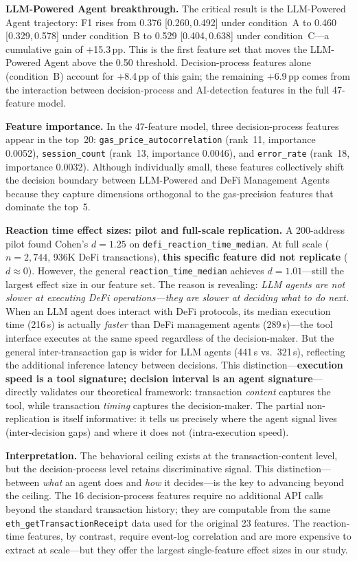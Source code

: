 \documentclass[sigconf,nonacm=false]{acmart}
\begin{document}
\textbf{LLM-Powered Agent breakthrough.} The critical result is the LLM-Powered Agent trajectory: F1 rises from 0.376 [0.260,\,0.492] under condition~A to 0.460 [0.329,\,0.578] under condition~B to 0.529 [0.404,\,0.638] under condition~C---a cumulative gain of $+$15.3\,pp. This is the first feature set that moves the LLM-Powered Agent above the 0.50 threshold. Decision-process features alone (condition~B) account for $+$8.4\,pp of this gain; the remaining $+$6.9\,pp comes from the interaction between decision-process and AI-detection features in the full 47-feature model.

\textbf{Feature importance.} In the 47-feature model, three decision-process features appear in the top~20: \texttt{gas\_price\_autocorrelation} (rank~11, importance 0.0052), \texttt{session\_count} (rank~13, importance 0.0046), and \texttt{error\_rate} (rank~18, importance 0.0032). Although individually small, these features collectively shift the decision boundary between LLM-Powered and DeFi Management Agents because they capture dimensions orthogonal to the gas-precision features that dominate the top~5.

\textbf{Reaction time effect sizes: pilot and full-scale replication.} A 200-address pilot found Cohen's $d{=}1.25$ on \texttt{defi\_reaction\_time\_median}. At full scale ($n{=}2{,}744$, 936K DeFi transactions), \textbf{this specific feature did not replicate} ($d{\approx}0$). However, the general \texttt{reaction\_time\_median} achieves $d{=}1.01$---still the largest effect size in our feature set. The reason is revealing: \emph{LLM agents are not slower at executing DeFi operations---they are slower at deciding what to do next.} When an LLM agent does interact with DeFi protocols, its median execution time (216\,s) is actually \emph{faster} than DeFi management agents (289\,s)---the tool interface executes at the same speed regardless of the decision-maker. But the general inter-transaction gap is wider for LLM agents (441\,s vs.\ 321\,s), reflecting the additional inference latency between decisions. This distinction---\textbf{execution speed is a tool signature; decision interval is an agent signature}---directly validates our theoretical framework: transaction \emph{content} captures the tool, while transaction \emph{timing} captures the decision-maker. The partial non-replication is itself informative: it tells us precisely where the agent signal lives (inter-decision gaps) and where it does not (intra-execution speed).

\textbf{Interpretation.} The behavioral ceiling exists at the transaction-content level, but the decision-process level retains discriminative signal. This distinction---between \emph{what} an agent does and \emph{how} it decides---is the key to advancing beyond the ceiling. The 16 decision-process features require no additional API calls beyond the standard transaction history; they are computable from the same \texttt{eth\_getTransactionReceipt} data used for the original 23 features. The reaction-time features, by contrast, require event-log correlation and are more expensive to extract at scale---but they offer the largest single-feature effect sizes in our study.
\end{document}
